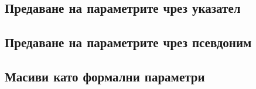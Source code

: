 \documentclass[fleqn,12pt]{article}
\begin{document}
\begin{flushleft}
\subsection{Предаване на параметрите чрез указател}
\subsection{Предаване на параметрите чрез псевдоним}
\subsection{Масиви като формални параметри}

\end{flushleft}
\end{document}
